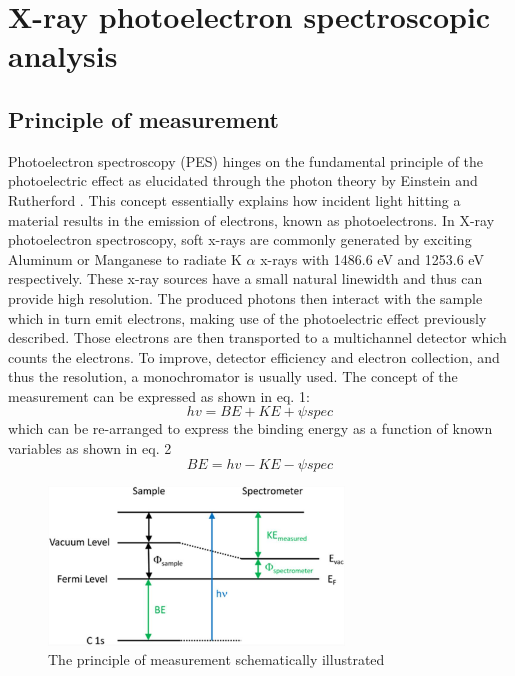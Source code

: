 \label{XPS_theory}
\section{X-ray photoelectron spectroscopic analysis}
\subsection{Principle of measurement}
Photoelectron spectroscopy (PES) hinges on the fundamental principle of the photoelectric effect  as elucidated through the photon theory by Einstein and Rutherford \cite{rutherford_xxxvii_1914, einstein_uber_1905}. This concept essentially explains how incident light hitting a material results in the emission of electrons, known as photoelectrons.
In X-ray photoelectron spectroscopy, soft x-rays are commonly generated by exciting Aluminum or Manganese to radiate K \(\alpha\) x-rays with 1486.6 eV and 1253.6 eV respectively. These x-ray sources have a small natural linewidth and thus can provide high resolution. The produced photons then interact with the sample which in turn emit electrons, making use of the photoelectric effect previously described. Those electrons are then transported to a multichannel detector which counts the electrons. To improve, detector efficiency and electron collection, and thus the resolution, a monochromator is usually used.\cite{stevie_introduction_2020} The concept of the measurement can be expressed as shown in eq. 1:
\begin{equation}
    hv = BE + KE + \psi spec
\end{equation}
which can be re-arranged to express the binding energy as a function of known variables \cite{stevie_introduction_2020} as shown in eq. 2
\begin{equation}
    BE = hv- KE - \psi spec
\end{equation}

\begin{figure}
    \centering
    \includegraphics[width=0.7\textwidth]{Figures/image4_3.jpeg}
    \caption{The principle of measurement schematically illustrated}
    \label{fig:enter-label}
\end{figure}


